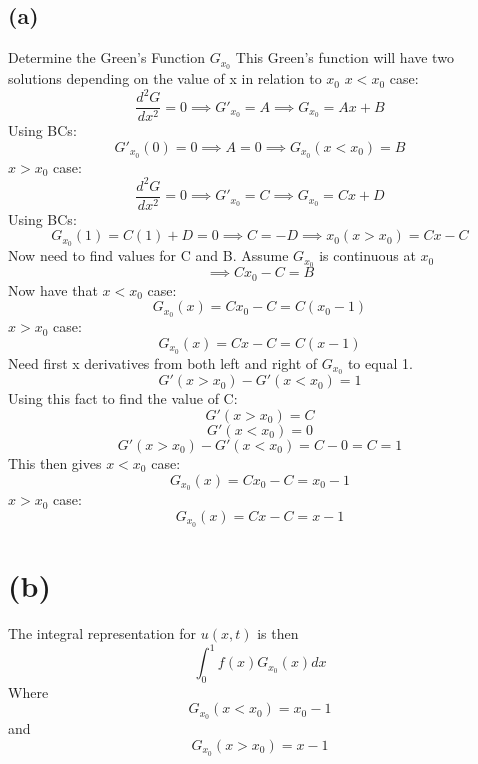 \documentclass[preview,12pt]{article}
\begin{document}
    \subsection*{(a)}
        Determine the Green's Function $G_{x_0}$
        This Green's function will have two solutions depending on the value of x in relation to $x_0$ \newline
        \indent $x<x_0$ case:
            $$\frac{d^2G}{dx^2}=0 \implies G'_{x_0}=A \implies G_{x_0}=Ax+B$$
        \indent Using BCs:
            $$G'_{x_0}(0)=0 \implies A=0 \implies \boxed{G_{x_0}(x<x_0)=B}$$
        \indent $x>x_0$ case:
            $$\frac{d^2G}{dx^2}=0 \implies G'_{x_0}=C \implies G_{x_0}=Cx+D$$
        \indent Using BCs:
            $$G_{x_0}(1)=C(1)+D=0 \implies C=-D \implies \boxed{{x_0}(x>x_0)=Cx-C}$$
        Now need to find values for C and B.  Assume $G_{x_0}$ is continuous at $x_0$
        $$\implies Cx_0-C=B$$
        Now have that \newline
        \indent $x<x_0$ case:
            $$\boxed{G_{x_0}(x)=Cx_0-C=C(x_0-1)}$$
        \indent $x>x_0$ case:
            $$\boxed{G_{x_0}(x)=Cx-C=C(x-1)}$$
        Need first x derivatives from both left and right of $G_{x_0}$ to equal 1. 
        $$G'(x>x_0)-G'(x<x_0)=1$$
        Using this fact to find the value of C:
        $$G'(x>x_0)=C$$
        $$G'(x<x_0)=0$$
        $$G'(x>x_0)-G'(x<x_0)=C-0=C=1$$
        This then gives
        \indent $x<x_0$ case:
            $$\boxed{G_{x_0}(x)=Cx_0-C=x_0-1}$$
         \indent $x>x_0$ case:
            $$\boxed{G_{x_0}(x)=Cx-C=x-1}$$    

\section*{(b)}
    The integral representation for $u(x,t)$ is then
    $$\int_0^1 f(x)G_{x_0}(x)dx$$ 
    Where
        $$G_{x_0}(x<x_0)=x_0-1$$
    and
        $$G_{x_0}(x>x_0)=x-1$$
        
\end{document}

